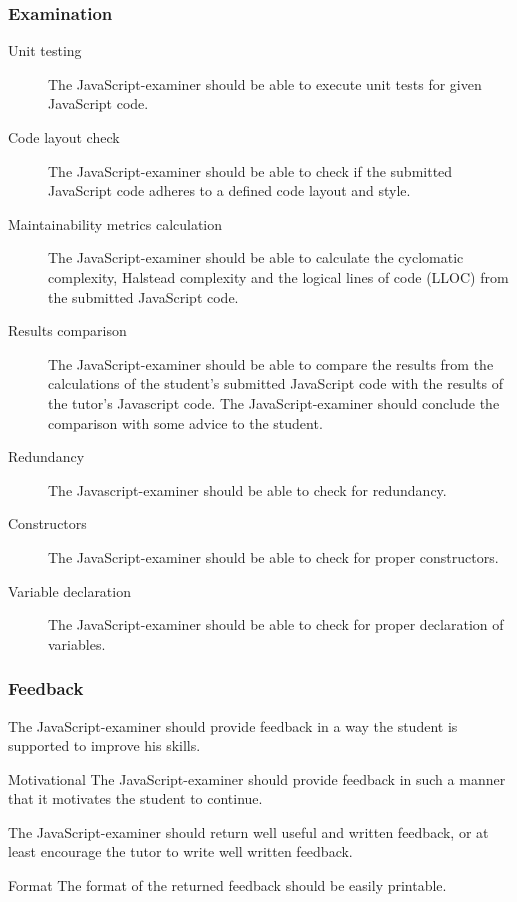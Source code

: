 \documentclass{article}
\begin{document}
\subsubsection{Examination}
\begin{description}
  \item[Unit testing] The JavaScript-examiner should be able to execute unit 
    tests for given JavaScript code.
  \item[Code layout check] The JavaScript-examiner should be able to check if 
    the submitted JavaScript code adheres to a defined code layout and style.
  \item[Maintainability metrics calculation] The JavaScript-examiner should be 
	able to calculate the cyclomatic complexity, Halstead complexity and the 
	logical lines of code (LLOC) from the submitted JavaScript code.
  \item[Results comparison] The JavaScript-examiner should be able to compare 
    the results from the calculations of the student's submitted JavaScript code
	with the results of the tutor's Javascript code. The JavaScript-examiner 
	should conclude the comparison with some advice to the student.
  \item[Redundancy] The Javascript-examiner should be able to check for
	redundancy.
  \item[Constructors] The JavaScript-examiner should be able to check for proper
	constructors.
  \item[Variable declaration] The JavaScript-examiner should be able to check
    for proper declaration of variables.
\end{description}

\subsubsection{Feedback}
\begin{description}
  \item[Useful] The JavaScript-examiner should provide feedback in a way
	the student is supported to improve his skills.
  \item{Motivational} The JavaScript-examiner should provide feedback in such a
    manner that it motivates the student to continue.
  \item[Elegance] The JavaScript-examiner should return well useful and written 
    feedback, or at least encourage the tutor to write well written feedback.
  \item{Format} The format of the returned feedback should be easily printable.
\end{description}
\end{document}
